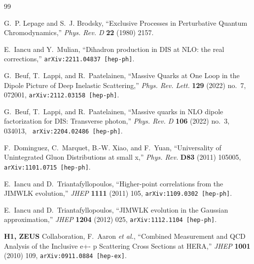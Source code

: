 \providecommand{\href}[2]{#2}\begingroup\raggedright\begin{thebibliography}{99}

G.~P. Lepage and S.~J. Brodsky, ``{Exclusive Processes in Perturbative Quantum Chromodynamics},'' {\em Phys. Rev. D} {\bf 22} (1980) 2157.

E.~Iancu and Y.~Mulian, ``{Dihadron production in DIS at NLO: the real corrections},'' \href{http://arxiv.org/abs/2211.04837}{{\tt arXiv:2211.04837 [hep-ph]}}.

G.~Beuf, T.~Lappi, and R.~Paatelainen, ``{Massive Quarks at One Loop in the
  Dipole Picture of Deep Inelastic Scattering},''
  \href{http://dx.doi.org/10.1103/PhysRevLett.129.072001}{{\em Phys. Rev.
  Lett.} {\bf 129} (2022) no.~7, 072001},
  \href{http://arxiv.org/abs/2112.03158}{{\tt arXiv:2112.03158 [hep-ph]}}.

G.~Beuf, T.~Lappi, and R.~Paatelainen, ``{Massive quarks in NLO dipole
  factorization for DIS: Transverse photon},''
  \href{http://dx.doi.org/10.1103/PhysRevD.106.034013}{{\em Phys. Rev. D} {\bf
  106} (2022) no.~3, 034013}, \href{http://arxiv.org/abs/2204.02486}{{\tt
  arXiv:2204.02486 [hep-ph]}}.

F.~Dominguez, C.~Marquet, B.-W. Xiao, and F.~Yuan, ``{Universality of
  Unintegrated Gluon Distributions at small x},''
  \href{http://dx.doi.org/10.1103/PhysRevD.83.105005}{{\em Phys. Rev.} {\bf
  D83} (2011)  105005},
\href{http://arxiv.org/abs/1101.0715}{{\tt arXiv:1101.0715 [hep-ph]}}.

E.~Iancu and D.~Triantafyllopoulos, ``{Higher-point correlations from the
  JIMWLK evolution},'' {\em JHEP} {\bf 1111} (2011)  105,
\href{http://arxiv.org/abs/1109.0302}{{\tt arXiv:1109.0302 [hep-ph]}}.

E.~Iancu and D.~Triantafyllopoulos, ``{JIMWLK evolution in the Gaussian
  approximation},'' {\em JHEP} {\bf 1204} (2012)  025,
\href{http://arxiv.org/abs/1112.1104}{{\tt arXiv:1112.1104 [hep-ph]}}.

{\bf H1, ZEUS} Collaboration, F.~Aaron {\em et al.}, ``{Combined Measurement
  and QCD Analysis of the Inclusive e+- p Scattering Cross Sections at HERA},''
  \href{http://dx.doi.org/10.1007/JHEP01(2010)109}{{\em JHEP} {\bf 1001} (2010)
   109},
\href{http://arxiv.org/abs/0911.0884}{{\tt arXiv:0911.0884 [hep-ex]}}.


\end{thebibliography}
